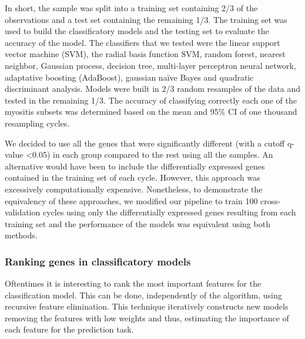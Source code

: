 In short, the sample was split into a training set containing 2/3 of the observations and a test set containing the remaining 1/3. The training set was used to build the classificatory models and the testing set to evaluate the accuracy of the model. The classifiers that we tested were the linear support vector machine (SVM), the radial basis function SVM, random forest, nearest neighbor, Gaussian process, decision tree, multi-layer perceptron neural network, adaptative boosting (AdaBoost), gaussian naïve Bayes and quadratic discriminant analysis. Models were built in 2/3 random resamples of the data and tested in the remaining 1/3. The accuracy of classifying correctly each one of the myositis subsets was determined based on the mean and 95\% CI of one thousand resampling cycles.

We decided to use all the genes that were significantly different (with a cutoff q-value <0.05) in each group compared to the rest using all the samples. An alternative would have been to include the differentially expressed genes contained in the training set of each cycle. However, this approach was excessively computationally expensive. Nonetheless, to demonstrate the equivalency of these approaches, we modified our pipeline to train 100 cross-validation cycles using only the differentially expressed genes resulting from each training set and the performance of the models was equivalent using both methods.

\subsubsection{Ranking genes in classificatory models}
Oftentimes it is interesting to rank the most important features for the classification model. This can be done, independently of the algorithm, using recursive feature elimination.\cite{Guyon2002} This technique iteratively constructs new models removing the features with low weights and thus, estimating the importance of each feature for the prediction task.